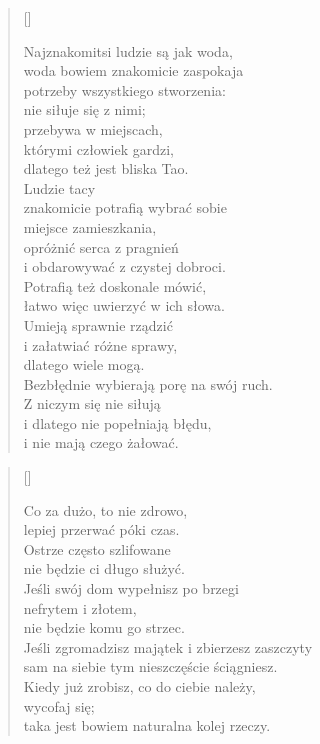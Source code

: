 \settowidth{\versewidth}{Najznakomitsi ludzie są jak woda,}
\begin{verse}[\versewidth]

  Najznakomitsi ludzie są jak woda, \\
  woda bowiem znakomicie zaspokaja \\
  potrzeby wszystkiego stworzenia: \\
  nie siłuje się z nimi; \\
  przebywa w miejscach, \\
  którymi człowiek gardzi, \\
  dlatego też jest bliska Tao. \\
  Ludzie tacy \\
  znakomicie potrafią wybrać sobie \\
  miejsce zamieszkania, \\
  opróżnić serca z pragnień \\
  i obdarowywać z czystej dobroci. \\
  Potrafią też doskonale mówić, \\
  łatwo więc uwierzyć w ich słowa. \\
  Umieją sprawnie rządzić \\
  i załatwiać różne sprawy, \\
  dlatego wiele mogą. \\
  Bezbłędnie wybierają porę na swój ruch. \\
  Z niczym się nie siłują \\
  i dlatego nie popełniają błędu, \\
  i nie mają czego żałować.
\end{verse}

\settowidth{\versewidth}{Jeśli zgromadzisz majątek i zbierzesz
  zaszczyty}
\begin{verse}[\versewidth]

  Co za dużo, to nie zdrowo, \\
  lepiej przerwać póki czas. \\
  Ostrze często szlifowane \\
  nie będzie ci długo służyć. \\
  Jeśli swój dom wypełnisz po brzegi \\
  nefrytem i złotem, \\
  nie będzie komu go strzec. \\
  Jeśli zgromadzisz majątek i zbierzesz zaszczyty \\
  sam na siebie tym nieszczęście ściągniesz. \\
  Kiedy już zrobisz, co do ciebie należy, \\
  wycofaj się; \\
  taka jest bowiem naturalna kolej rzeczy.
\end{verse}

